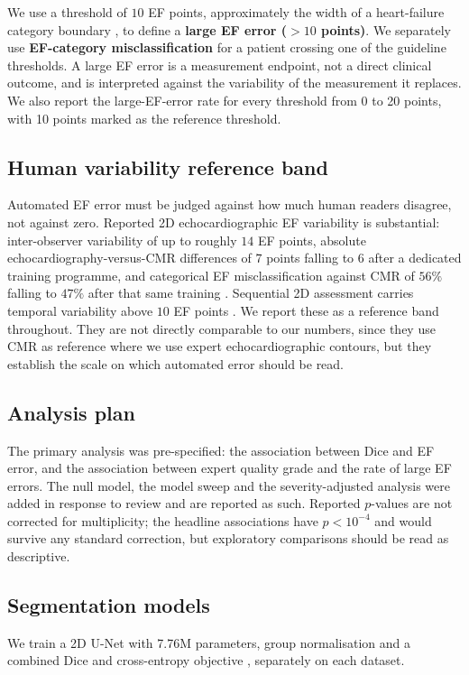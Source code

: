 \documentclass[conference,a4paper]{IEEEtran}
\begin{document}
We use a threshold of $10$ EF points, approximately the width of a heart-failure category
boundary \cite{mcdonagh2021}, to define a \textbf{large EF error ($>10$ points)}. We
separately use \textbf{EF-category misclassification} for a patient crossing one of the
guideline thresholds. A large EF error is a measurement endpoint, not a direct clinical
outcome, and is interpreted against the variability of the measurement it replaces. We
also report the large-EF-error rate for every threshold from 0 to 20 points, with 10 points
marked as the reference threshold.

\subsection{Human variability reference band}
Automated EF error must be judged against how much human readers disagree, not against
zero. Reported 2D echocardiographic EF variability is substantial: inter-observer
variability of up to roughly $14$ EF points, absolute echocardiography-versus-CMR
differences of $7$ points falling to $6$ after a dedicated training programme, and
categorical EF misclassification against CMR of $56\%$ falling to $47\%$ after that same
training \cite{thavendiranathan2013b}. Sequential 2D assessment carries temporal
variability above $10$ EF points \cite{thavendiranathan2013}. We report these as a
reference band throughout. They are not directly comparable to our numbers, since they use
CMR as reference where we use expert echocardiographic contours, but they establish the
scale on which automated error should be read.

\subsection{Analysis plan}
The primary analysis was pre-specified: the association between Dice and EF error, and the
association between expert quality grade and the rate of large EF errors. The null model,
the model sweep and the severity-adjusted analysis were added in response to review and are
reported as such. Reported $p$-values are not corrected for multiplicity; the headline
associations have $p < 10^{-4}$ and would survive any standard correction, but exploratory
comparisons should be read as descriptive.

\subsection{Segmentation models}
We train a 2D U-Net \cite{ronneberger2015} with 7.76M parameters, group normalisation and a
combined Dice and cross-entropy objective \cite{milletari2016}, separately on each dataset.
\end{document}

